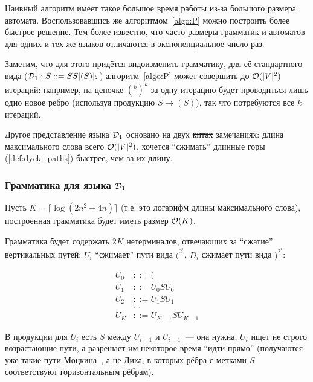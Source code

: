 
Наивный алгоритм имеет такое большое время работы из-за большого размера автомата. Воспользовавшись же алгоритмом~\ref{algo:P} можно построить более быстрое решение. Тем более известно, что часто размеры грамматик и автоматов для одних и тех же языков отличаются в экспоненциальное число раз.

Заметим, что для этого придётся видоизменить грамматику, для её стандартного вида ($\mathcal{D}_1 : S ::= SS | ( S ) | \varepsilon$) алгоритм~\ref{algo:P} может совершить до $\mathcal{O}(|V|^2)$ итераций: например, на цепочке $(^k )^k$ за одну итерацию будет проводиться лишь одно новое ребро (используя продукцию $S \to ( S )$), так что потребуются все $k$ итераций.

Другое представление языка $\mathcal{D}_1$ основано на двух \sout{китах} замечаниях: длина максимального слова всего $\mathcal{O}(|V|^2)$, хочется ``сжимать'' длинные горы (\ref{def:dyck_paths}) быстрее, чем за их длину.

\subsubsection{Грамматика для языка $\mathcal{D}_1$}


Пусть $K = \lceil \log (2 n^2 + 4n) \rceil$ (т.е. это логарифм длины максимального слова), построенная грамматика будет иметь размер $\mathcal{O}(K)$.

Грамматика будет содержать $2K$ нетерминалов, отвечающих за ``сжатие'' вертикальных путей: $U_i$ ``сжимает'' пути вида $(^{2^i}$, $D_i$ сжимает пути вида $)^{2^i}$:

\begin{align}\label{eq:U}
  U_0 &::= ( \\
  U_1 &::= U_0 S U_0 \\
  U_2 &::= U_1 S U_1 \\
  &\dots \\
  U_K &::= U_{K-1} S U_{K-1} 
\end{align}

В продукции для $U_i$ есть $S$ между $U_{i-1}$ и $U_{i-1}$~--- она нужна, $U_i$ ищет не строго возрастающие пути, а разрешает им некоторое время ``идти прямо'' (получаются уже такие пути Моцкина~\cite{Donaghey1977}, а не Дика, в которых рёбра с метками $S$ соответствуют горизонтальным рёбрам).

